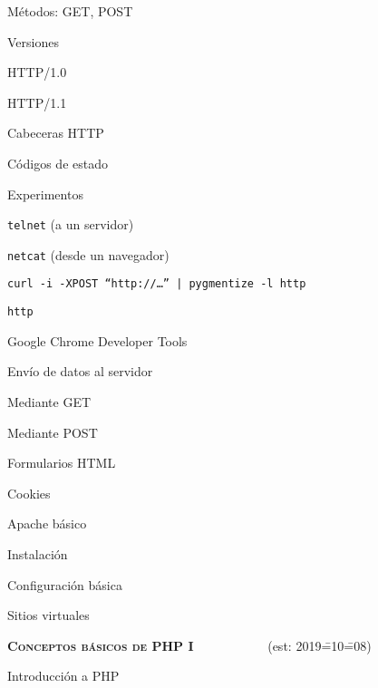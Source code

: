 \begin{longenum}
\begin{longenum}
\begin{longenum}
            \item Métodos: GET, POST
            \item Versiones
            \begin{longenum}
                \item HTTP/1.0
                \item HTTP/1.1
            \end{longenum}
            \item Cabeceras HTTP
            \item Códigos de estado
            \item Experimentos
            \begin{longenum}
                \item \texttt{telnet} (a un servidor)
                \item \texttt{netcat} (desde un navegador)
                \item \texttt{curl -i -XPOST “http://…” | pygmentize -l http} 
                \item \texttt{http} 
                \item Google Chrome Developer Tools 
            \end{longenum}
            \item Envío de datos al servidor
            \begin{longenum}
                \item Mediante GET
                \item Mediante POST
                \item Formularios HTML
            \end{longenum}
            \item Cookies
        \end{longenum}
        \item Apache básico \opcional\
        \begin{longenum}
            \item Instalación
            \item Configuración básica
            \item Sitios virtuales
        \end{longenum}
    \end{longenum}
    \item \textbf{\textsc{Conceptos básicos de PHP I}} \ \ \ \ \ \ \ \ \ \ \ (est: 2019\==10\==08)
    \begin{longenum}
        \item Introducción a PHP

\end{longenum}
\end{longenum}
